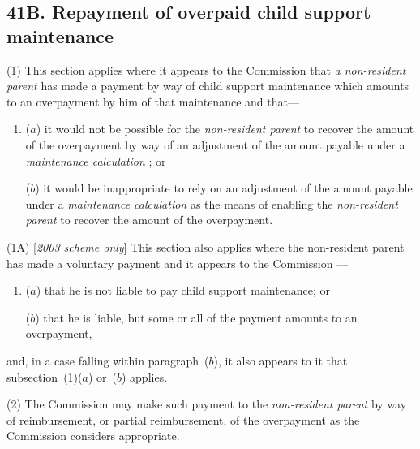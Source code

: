 \documentclass[12pt,a4paper]{article}
\begin{document}
\subsection{41B. Repayment of overpaid child support maintenance}

(1) This section applies where it appears to the 
Commission  %
that 
\emph{a non-resident parent}  %
has made a payment by way of child support maintenance which amounts to an overpayment by him of that maintenance and that—
\begin{enumerate}\item[]
($a$) it would not be possible for the 
\emph{non-resident parent}  %
to recover the amount of the overpayment by way of an adjustment of the amount payable under a 
\emph{maintenance calculation}%
; or

($b$) it would be inappropriate to rely on an adjustment of the amount payable under a 
\emph{maintenance calculation}  %
as the means of enabling the 
\emph{non-resident parent}  %
to recover the amount of the overpayment.
\end{enumerate}

(1A) [\emph{2003 scheme only}] This section also applies where the non-resident parent has made a voluntary payment and it appears to the 
Commission%
—
\begin{enumerate}\item[]
($a$) that he is not liable to pay child support maintenance; or

($b$) that he is liable, but some or all of the payment amounts to an overpayment,
\end{enumerate}
and, in a case falling within paragraph~($b$), it also appears to 
it  %
that subsection~(1)($a$)  or~($b$)  applies.

(2) The 
Commission  %
may make such payment to the 
\emph{non-resident parent}  %
by way of reimbursement, or partial reimbursement, of the overpayment as the 
Commission  %
considers appropriate.
\end{document}

